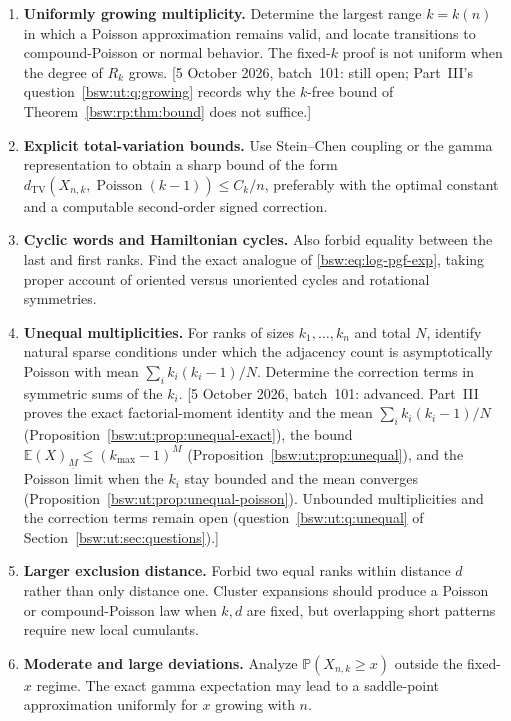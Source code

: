 \documentclass[11pt,letterpaper]{article}
\theoremstyle{definition}
\theoremstyle{remark}
\newcommand{\EE}{\mathbb E}
\newcommand{\PP}{\mathbb P}
\newcommand{\fall}[2]{(#1)_{\underline{#2}}}
\newcommand{\Pois}{\operatorname{Poisson}}
\begin{document}
\begin{enumerate}[leftmargin=2em]
\item \textbf{Uniformly growing multiplicity.}
Determine the largest range $k=k(n)$ in which a Poisson approximation remains
valid, and locate transitions to compound-Poisson or normal behavior.  The
fixed-$k$ proof is not uniform when the degree of $R_k$ grows.
[5 October 2026, batch~101: still open; Part~III's
question~\ref{bsw:ut:q:growing} records why the $k$-free bound of
Theorem~\ref{bsw:rp:thm:bound} does not suffice.]

\item \textbf{Explicit total-variation bounds.}
Use Stein--Chen coupling or the gamma representation to obtain a sharp bound
of the form
$d_{\mathrm{TV}}(X_{n,k},\Pois(k-1))\le C_k/n$, preferably with the optimal
constant and a computable second-order signed correction.

\item \textbf{Cyclic words and Hamiltonian cycles.}
Also forbid equality between the last and first ranks.  Find the exact
analogue of \eqref{bsw:eq:log-pgf-exp}, taking proper account of oriented versus
unoriented cycles and rotational symmetries.

\item \textbf{Unequal multiplicities.}
For ranks of sizes $k_1,\ldots,k_n$ and total $N$, identify natural sparse
conditions under which the adjacency count is asymptotically Poisson with
mean
$\sum_i k_i(k_i-1)/N$.  Determine the correction terms in symmetric sums of
the $k_i$.
[5 October 2026, batch~101: advanced.  Part~III proves the exact
factorial-moment identity and the mean $\sum_ik_i(k_i-1)/N$
(Proposition~\ref{bsw:ut:prop:unequal-exact}), the bound
$\EE\fall XM\le(k_{\max}-1)^M$ (Proposition~\ref{bsw:ut:prop:unequal}),
and the Poisson limit when the $k_i$ stay bounded and the mean converges
(Proposition~\ref{bsw:ut:prop:unequal-poisson}).  Unbounded multiplicities
and the correction terms remain open (question~\ref{bsw:ut:q:unequal} of
Section~\ref{bsw:ut:sec:questions}).]

\item \textbf{Larger exclusion distance.}
Forbid two equal ranks within distance $d$ rather than only distance one.
Cluster expansions should produce a Poisson or compound-Poisson law when
$k,d$ are fixed, but overlapping short patterns require new local cumulants.

\item \textbf{Moderate and large deviations.}
Analyze $\PP(X_{n,k}\ge x)$ outside the fixed-$x$ regime.  The exact gamma
expectation may lead to a saddle-point approximation uniformly for
$x$ growing with $n$.


\end{enumerate}
\end{document}
